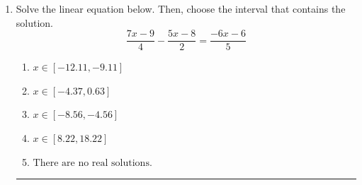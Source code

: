 \documentclass[14pt]{extbook}
\newcommand{\litem}[1]{\item#1\hspace*{-1cm}\rule{\textwidth}{0.4pt}}
\begin{document}
\begin{enumerate}
{\begin{enumerate}[label=\Alph*.]
\end{enumerate} }
\litem{
Solve the linear equation below. Then, choose the interval that contains the solution.\[ \frac{7x -9}{4} - \frac{5x -8}{2} = \frac{-6x -6}{5} \]\begin{enumerate}[label=\Alph*.]
\item \( x \in [-12.11, -9.11] \)
\item \( x \in [-4.37, 0.63] \)
\item \( x \in [-8.56, -4.56] \)
\item \( x \in [8.22, 18.22] \)
\item \( \text{There are no real solutions.} \)

\end{enumerate} }
\end{enumerate}
\end{document}
